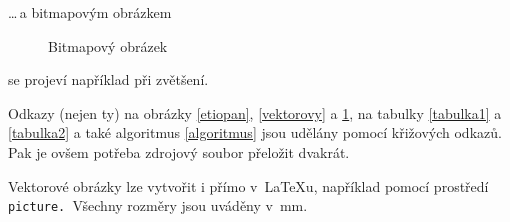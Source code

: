 \documentclass[a4paper,11pt]{article}
\begin{document}
\noindent\ldots\,a bitmapovým obrázkem
\begin{figure}[ht]
  \begin{center}
  \caption{Bitmapový obrázek}
  \label{bitmapovy}
  \end{center}
\end{figure}

se projeví například při zvětšení.

Odkazy (nejen ty) na obrázky \ref{etiopan}, \ref{vektorovy} a \ref{bitmapovy}, na tabulky \ref{tabulka1} a \ref{tabulka2}
a také algoritmus \ref{algoritmus} jsou udělány pomocí křižových odkazů.
Pak je ovšem potřeba zdrojový soubor přeložit dvakrát.

Vektorové obrázky lze vytvořit i přímo v~{\LaTeX}u, například pomocí prostředí\,\,\texttt{picture. }Všechny rozměry jsou uváděny v~mm.
\end{document}
